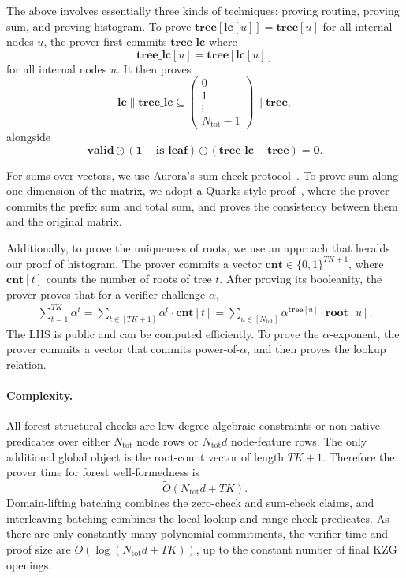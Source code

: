The above involves essentially three kinds of techniques:
  proving routing, proving sum,
  and proving histogram.
  To prove $\mathbf{tree}[\mathbf{lc}[u]]=\mathbf{tree}[u]$ for all internal nodes $u$, the prover first
  commits $\mathbf{tree\_lc}$ where
  \[\mathbf{tree\_lc}[u] = \mathbf{tree}[\mathbf{lc}[u]]\]
  for all internal nodes $u$.
  It then proves
  \[
    \mathbf{lc}\|\mathbf{tree\_lc} \subseteq \left(\begin{matrix}
    0\\ 1\\ \vdots\\ N_{\mathrm{tot}}-1
    \end{matrix}\right)\|\mathbf{tree},
  \]
  alongside
  \[
    \mathbf{valid}\odot(\mathbf{1}-\mathbf{is\_leaf})\odot(\mathbf{tree\_lc} - \mathbf{tree}) = \mathbf{0}.
  \]

For sums over vectors, we use Aurora's sum-check protocol~\cite{aurora19}.
  To prove sum along one dimension of the matrix,
  we adopt a Quarks-style proof~\cite{quarks20},
  where the prover commits the prefix sum and total sum, 
  and proves the consistency between them and the original matrix.

Additionally, to prove the uniqueness of roots, we use
an approach that heralds our proof of histogram.
The prover commits a vector $\mathbf{cnt}\in \{0, 1\}^{TK+1}$, where $\mathbf{cnt}[t]$ counts the number of roots of tree $t$.
After proving its booleanity, the prover proves that
for a verifier challenge $\alpha$, 
\begin{align}
  \sum_{t=1}^{TK}\alpha^t = \sum_{t\in [TK+1]} \alpha^t\cdot \mathbf{cnt}[t] = \sum_{u\in [N_{\mathrm{tot}}]} \alpha^{\mathbf{tree}[u]}\cdot \mathbf{root}[u].
\end{align}
The LHS is public and can be computed efficiently.
To prove the $\alpha$-exponent, the prover commits a vector
that commits power-of-$\alpha$, and then proves the lookup relation.

\paragraph{Complexity.}
All forest-structural checks are low-degree algebraic constraints or
non-native predicates over either $N_{\mathrm{tot}}$ node rows or
$N_{\mathrm{tot}}d$ node-feature rows. The
only additional global object is the root-count vector of length $TK+1$.
Therefore the prover time for forest well-formedness is
\[
    \tilde{O}(N_{\mathrm{tot}}d + TK).
\]
Domain-lifting batching combines the zero-check and sum-check claims, and
interleaving batching combines the local lookup and range-check predicates.
As there are only constantly many polynomial commitments,
the verifier time and proof size are
$\tilde{O}(\log(N_{\mathrm{tot}}d+TK))$, up to the constant number of final KZG
openings.

